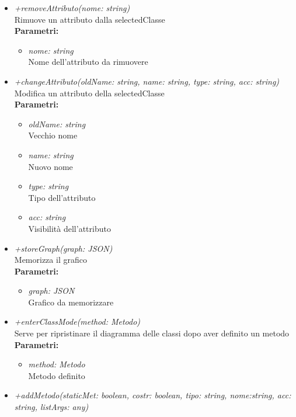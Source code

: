 \begin{itemize}
\begin{itemize}
\begin{itemize}
    		\end{itemize}
    		\item \emph{+removeAttributo(nome: string)}\\
    		Rimuove un attributo dalla selectedClasse\\
    		\textbf{Parametri:}
    		\begin{itemize}
    			\item \emph{nome: string}\\
    			Nome dell'attributo da rimuovere
    		\end{itemize}
    		\item \emph{+changeAttributo(oldName: string, name: string, type: string, acc: string)}\\
    		Modifica un attributo della selectedClasse\\
    		\textbf{Parametri:}
    		\begin{itemize}
    			\item \emph{oldName: string}\\
    			Vecchio nome
    			\item \emph{name: string}\\
    			Nuovo nome
    			\item \emph{type: string}\\
    			Tipo dell'attributo
    			\item \emph{acc: string}\\
    			Visibilità dell'attributo
    		\end{itemize}
    		\item \emph{+storeGraph(graph: JSON)}\\
    		Memorizza il grafico\\
    		\textbf{Parametri:}
    		\begin{itemize}
    			\item \emph{graph: JSON}\\
    			Grafico da memorizzare
    		\end{itemize}
    		\item \emph{+enterClassMode(method: Metodo)}\\
    		Serve per ripristinare il diagramma delle classi dopo aver definito un metodo\\
    		\textbf{Parametri:}
    		\begin{itemize}
    			\item \emph{method: Metodo}\\
    			Metodo definito
    		\end{itemize}
    		\item \emph{+addMetodo(staticMet: boolean, costr: boolean, tipo: string, nome:string, acc: string, listArgs: any)}\\

\end{itemize}
\end{itemize}
